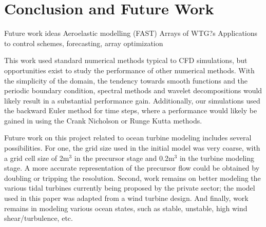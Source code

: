 \section{Conclusion and Future Work}

Future work ideas
Aeroelastic modelling (FAST)
Arrays of WTG?s
Applications to control schemes, forecasting, array optimization

This work used standard numerical methods typical to CFD simulations, but opportunities exist to study the performance of other numerical methods. With the simplicity of the domain, the tendency towards smooth functions and the periodic boundary condition, spectral methods and wavelet decompositions would likely result in a substantial performance gain. Additionally, our simulations used the backward Euler method for time steps, where a performance would likely be gained in using the Crank Nicholson or Runge Kutta methods.

Future work on this project related to ocean turbine modeling includes several possibilities. For one, the grid size used in the initial model was very coarse, with a grid cell size of 2m$^3$ in the precursor stage and 0.2m$^3$ in the turbine modeling stage. A more accurate representation of the precursor flow could be obtained by doubling or tripping the resolution. Second, work remains on better modeling the various tidal turbines currently being proposed by the private sector; the model used in this paper was adapted from a wind turbine design. And finally, work remains in modeling various ocean states, such as stable, unstable, high wind shear/turbulence, etc.



